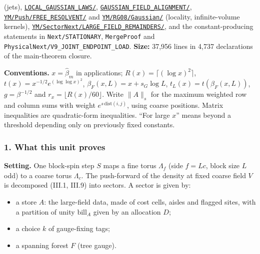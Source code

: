 \documentclass[
  letterpaper,
  11pt]{article}
\providecommand{\tightlist}{%
  \setlength{\itemsep}{0pt}\setlength{\parskip}{0pt}}
\begin{document}
(jets),
\href{https://github.com/yang-mills-group/OpenAI-YM-20261028/tree/3456e5e75cf8d4cd558955a5c7638fba2d68f464/YM/AnalyticBridge/LOCAL_GAUSSIAN_LAWS}{\texttt{LOCAL\_GAUSSIAN\_LAWS/}},
\href{https://github.com/yang-mills-group/OpenAI-YM-20261028/tree/3456e5e75cf8d4cd558955a5c7638fba2d68f464/YM/AnalyticBridge/GAUSSIAN_FIELD_ALIGNMENT}{\texttt{GAUSSIAN\_FIELD\_ALIGNMENT/}},
\href{https://github.com/yang-mills-group/OpenAI-YM-20261028/tree/3456e5e75cf8d4cd558955a5c7638fba2d68f464/YM/Push/FREE_RESOLVENT}{\texttt{YM/Push/FREE\_RESOLVENT/}}
and
\href{https://github.com/yang-mills-group/OpenAI-YM-20261028/tree/3456e5e75cf8d4cd558955a5c7638fba2d68f464/YM/RG08/Gaussian}{\texttt{YM/RG08/Gaussian/}}
(locality, infinite-volume kernels),
\href{https://github.com/yang-mills-group/OpenAI-YM-20261028/tree/3456e5e75cf8d4cd558955a5c7638fba2d68f464/YM/SectorNext/LARGE_FIELD_REMAINDERS}{\texttt{YM/SectorNext/LARGE\_FIELD\_REMAINDERS/}},
and the constant-producing statements in \texttt{Next/STATIONARY},
\texttt{MergeProof} and \texttt{PhysicalNext/V9\_JOINT\_ENDPOINT\_LOAD}.
\textbf{Size:} 37,956 lines in 4,737 declarations of the main-theorem
closure.

\textbf{Conventions.} \(x=\hat\beta_m\) in applications;
\(R(x)=\lceil(\log x)^2\rceil\), \(t(x)=x^{-1/2}e^{(\log\log x)^2}\),
\(\beta_F(x,L)=x+s_G\log L\), \(t_L(x)=t(\beta_F(x,L))\),
\(g=\beta^{-1/2}\) and \(r_x=\lfloor R(x)/60\rfloor\). Write \(\|A\|_s\)
for the maximum weighted row and column sums with weight
\(e^{s\,\mathrm{dist}(i,j)}\), using coarse positions. Matrix
inequalities are quadratic-form inequalities. ``For large \(x\)'' means
beyond a threshold depending only on previously fixed constants.

\subsubsection{1. What this unit proves}\label{what-this-unit-proves-6}

\textbf{Setting.} One block-spin step \(S\) maps a fine torus
\(\Lambda_f\) (side \(f=Lc\), block size \(L\) odd) to a coarse torus
\(\Lambda_c\). The push-forward of the density at fixed coarse field
\(V\) is decomposed (III.1, III.9) into sectors. A sector is given by:

\begin{itemize}
\tightlist
\item
  a store \(A\): the large-field data, made of cost cells, aisles and
  flagged sites, with a partition of unity \(\mathrm{bill}_A\) given by
  an allocation \(D\);
\item
  a choice \(k\) of gauge-fixing tags;
\item
  a spanning forest \(F\) (tree gauge).
\end{itemize}
\end{document}
